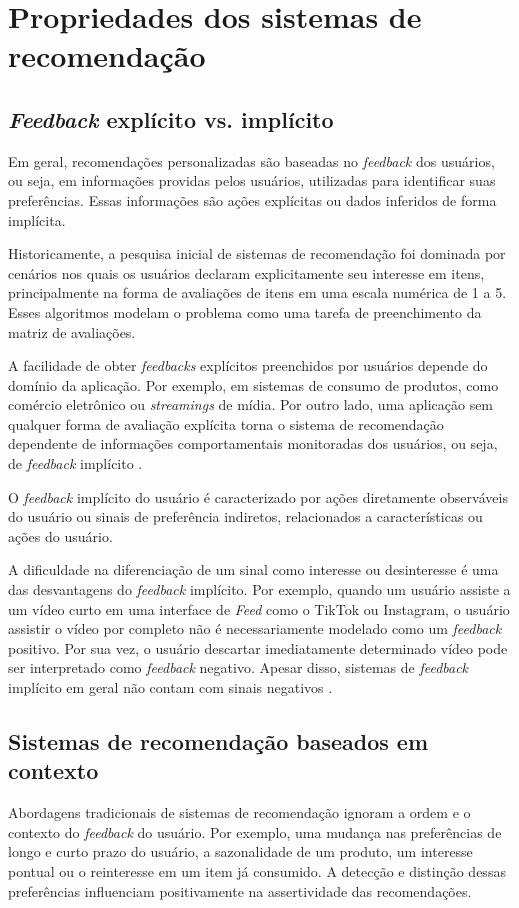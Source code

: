 \section{Propriedades dos sistemas de recomendação}
\subsection{\textit{Feedback} explícito vs. implícito}

Em geral, recomendações personalizadas são baseadas no \textit{feedback} dos
usuários, ou seja, em informações providas pelos usuários, utilizadas para
identificar suas preferências. Essas informações são ações explícitas ou dados
inferidos de forma implícita.

Historicamente, a pesquisa inicial de sistemas de recomendação foi dominada por
cenários nos quais os usuários declaram explicitamente seu interesse em itens,
principalmente na forma de avaliações de itens em uma escala numérica de 1 a 5.
Esses algoritmos modelam o problema como uma tarefa de preenchimento da matriz
de avaliações.

A facilidade de obter \textit{feedbacks} explícitos preenchidos por usuários
depende do domínio da aplicação. Por exemplo, em sistemas de consumo de
produtos, como comércio eletrônico ou \textit{streamings} de mídia. Por outro
lado, uma aplicação sem qualquer forma de avaliação explícita torna o sistema de
recomendação dependente de informações comportamentais monitoradas dos usuários,
ou seja, de \textit{feedback} implícito \cite{ludewig2020advances}.

O \textit{feedback} implícito do usuário é caracterizado por ações diretamente
observáveis do usuário ou sinais de preferência indiretos, relacionados a
características ou ações do
usuário.

A dificuldade na diferenciação de um sinal como interesse ou desinteresse é uma
das desvantagens do \textit{feedback} implícito. Por exemplo, quando um usuário
assiste a um vídeo curto em uma interface de \textit{Feed} como o TikTok ou
Instagram, o usuário assistir o vídeo por completo não é necessariamente
modelado como um \textit{feedback} positivo. Por sua vez, o usuário descartar
imediatamente determinado vídeo pode ser interpretado como \textit{feedback}
negativo. Apesar disso, sistemas de \textit{feedback} implícito em geral não contam
com sinais negativos \cite{ludewig2020advances,JLZ18}.

\subsection{Sistemas de recomendação baseados em contexto} Abordagens
tradicionais de sistemas de recomendação ignoram a ordem e o contexto do
\textit{feedback} do usuário. Por exemplo, uma mudança nas preferências de longo
e curto prazo do usuário, a sazonalidade de um produto, um interesse pontual ou
o reinteresse em um item já consumido. A detecção e distinção dessas
preferências influenciam positivamente na assertividade das recomendações.

